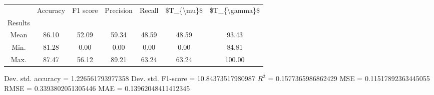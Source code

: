 \begin{tabular}{|c|c|c|c|c|c|c|}
\toprule
{} &  Accuracy &  F1 score &  Precision &  Recall &  \$T\_\{\textbackslash mu\}\$ &  \$T\_\{\textbackslash gamma\}\$ \\
Results &           &           &            &         &            &               \\
\hline
Mean    &     86.10 &     52.09 &      59.34 &   48.59 &      48.59 &         93.43 \\
Min.    &     81.28 &      0.00 &       0.00 &    0.00 &       0.00 &         84.81 \\
Max.    &     87.47 &     56.12 &      89.21 &   63.24 &      63.24 &        100.00 \\
\bottomrule
\end{tabular}

 Dev. std. accuracy = 1.226561793977358
 Dev. std. F1-score = 10.84373517980987
 $R^2$ = 0.1577365986862429
 MSE = 0.11517892363445055
 RMSE = 0.3393802051305446
 MAE = 0.13962048411412345